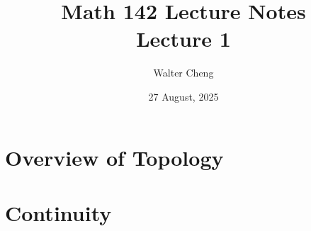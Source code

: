 \documentclass[11pt]{article}
\title{Math 142 Lecture Notes\\ Lecture 1}
\date{27 August, 2025}
\author{Walter Cheng}
\begin{document}
\maketitle

\section{Overview of Topology}

\section{Continuity}
\end{document}
